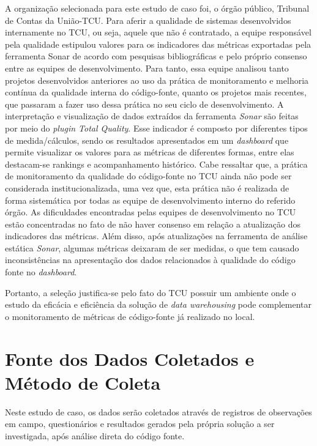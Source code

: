 A organização selecionada para este estudo de caso foi, o órgão público, Tribunal de Contas da União-TCU. Para aferir a qualidade de sistemas desenvolvidos internamente no TCU, ou seja, aquele que não é contratado, a equipe responsável pela qualidade estipulou valores para os indicadores das métricas exportadas pela ferramenta Sonar de acordo com pesquisas bibliográficas e pelo próprio consenso entre as equipes de desenvolvimento. Para tanto, essa equipe analisou tanto projetos desenvolvidos anteriores ao uso da prática de monitoramento e melhoria contínua da qualidade interna do código-fonte, quanto os projetos mais recentes, que passaram a fazer uso dessa prática no seu ciclo de desenvolvimento. A interpretação e visualização de dados extraídos da ferramenta  \textit{Sonar} são feitas por meio do \textit{plugin Total Quality}. Esse indicador é composto por diferentes tipos de medida/cálculos, sendo os resultados apresentados em um \textit{dashboard} que permite visualizar os valores para as métricas de diferentes formas, entre elas destacam-se rankings e acompanhamento histórico. Cabe ressaltar que, a prática de monitoramento da qualidade do código-fonte no TCU ainda não pode ser considerada institucionalizada, uma vez que, esta prática não é realizada de forma sistemática por todas as equipe de desenvolvimento interno do referido órgão.
As dificuldades encontradas pelas equipes de desenvolvimento no TCU estão concentradas no fato de não haver consenso em relação a atualização dos indicadores das métricas. Além disso, após atualizações na ferramenta de análise estática \textit{Sonar}, algumas métricas deixaram de ser medidas, o que tem causado inconsistências na apresentação dos dados relacionados à qualidade do código fonte no \textit{dashboard}.

Portanto, a seleção justifica-se pelo fato do TCU possuir um ambiente onde o estudo da eficácia e eficiência da solução de \textit{data warehousing} pode complementar o monitoramento de métricas de código-fonte já realizado no local.



\section{Fonte dos Dados Coletados e Método de Coleta} \label{sec:Fonte e Método de Coleta de Dados}

Neste estudo de caso, os dados serão coletados através de registros de observações em campo, questionários e resultados gerados pela própria solução a ser investigada, após análise direta do código fonte.

